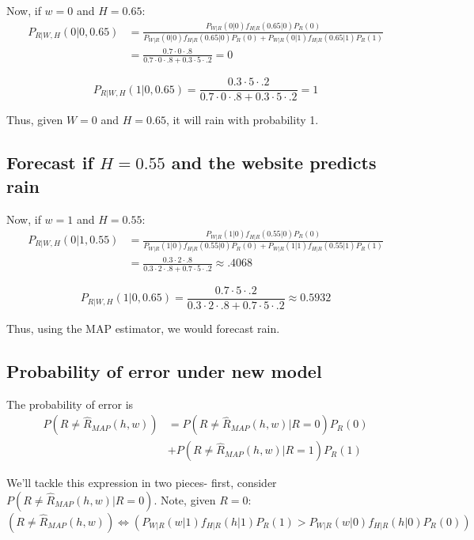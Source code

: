 \documentclass[paper=a4, fontsize=11pt]{scrartcl} %
\numberwithin{equation}{section} %
\numberwithin{figure}{section} %
\numberwithin{table}{section} %
\begin{document}
Now, if $w = 0$ and $H = 0.65$:
\begin{align*}
P_{R | W, H}(0 | 0,0.65) &= \frac{P_{W | R}(0 | 0) f_{H | R}(0.65 | 0) P_R(0)}{P_{W | R}(0 | 0) f_{H | R}(0.65 | 0) P_R(0) + P_{W | R}(0 | 1) f_{H | R}(0.65 | 1) P_R(1)} \\
   &= \frac{0.7 \cdot 0 \cdot .8}{0.7 \cdot 0 \cdot .8 + 0.3 \cdot 5 \cdot .2} = 0
\end{align*}

\[ P_{R | W, H}(1 | 0,0.65) = \frac{ 0.3 \cdot 5 \cdot .2}{0.7 \cdot 0 \cdot .8 + 0.3 \cdot 5 \cdot .2} = 1 \]

Thus, given $W = 0$ and $H = 0.65$, it will rain with probability 1.

\subsection{Forecast if $H = 0.55$ and the website predicts rain}

Now, if $w = 1$ and $H = 0.55$:
\begin{align*}
P_{R | W, H}(0 | 1, 0.55) &= \frac{P_{W | R}(1 | 0) f_{H | R}(0.55 | 0) P_R(0)}{P_{W | R}(1 | 0) f_{H | R}(0.55 | 0) P_R(0) + P_{W | R}(1 | 1) f_{H | R}(0.55 | 1) P_R(1)} \\
   &= \frac{0.3 \cdot 2 \cdot .8}{0.3 \cdot 2 \cdot .8 + 0.7 \cdot 5 \cdot .2} \approx .4068
\end{align*}

\[ P_{R | W, H}(1 | 0,0.65) = \frac{0.7 \cdot 5 \cdot .2}{0.3 \cdot 2 \cdot .8 + 0.7 \cdot 5 \cdot .2} \approx 0.5932
 \]
 
 Thus, using the MAP estimator, we would forecast rain.
 
\subsection{Probability of error under new model}

The probability of error is
\begin{align*}
P(R \ne \hat{R}_{MAP}(h, w)) &= P(R \ne \hat{R}_{MAP}(h, w) | R = 0)P_R(0) \\
& + P(R \ne \hat{R}_{MAP}(h, w) | R = 1)P_R(1)
\end{align*}

We'll tackle this expression in two pieces- first, consider $P(R \ne \hat{R}_{MAP}(h, w) | R = 0)$. Note, given $R = 0$:
\begin{equation*}
(R \ne \hat{R}_{MAP}(h, w)) \iff \left(P_{W | R}(w | 1) f_{H | R}(h | 1) P_R(1) > P_{W | R}(w | 0) f_{H | R}(h | 0) P_R(0)\right)
\end{equation*}
\end{document}
